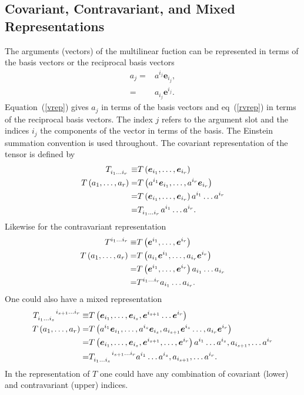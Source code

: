 \documentclass[12pt]{report}
\newcommand{\bm}[1]{\boldsymbol{#1}}
\newcommand{\lp}{\left (}
\newcommand{\rp}{\right )}
\newcommand{\f}[2]{{#1}\lp {#2} \rp}
\newcommand{\eb}{\bm{e}}
\begin{document}
\subsection{Covariant, Contravariant, and Mixed Representations}

The arguments (vectors) of the multilinear fuction can be represented in terms of the basis vectors or the reciprocal basis vectors
\begin{align}
	a_{j} =& a^{i_{j}}\eb_{i_{j}}, \label{vrep}\\
	      =& a_{i_{j}}\eb^{i_{j}}. \label{rvrep}
\end{align}
Equation~(\ref{vrep}) gives $a_{j}$ in terms of the basis vectors and eq~(\ref{rvrep}) in terms of the reciprocal basis vectors. The index
$j$ refers to the argument slot and the indices $i_{j}$ the components of the vector in terms of the basis.  The Einstein summation
convention is used throughout.  The covariant representation of the tensor is defined by
\begin{align}
	T\indices{_{i_{1}\dots i_{r}}} \equiv& \f{T}{\eb_{i_{1}},\dots,\eb_{i_{r}}} \\
	\f{T}{a_{1},\dots,a_{r}} =& \f{T}{a^{i_{1}}\eb_{i_{1}},\dots,a^{i_{r}}\eb_{i_{r}}} \nonumber \\
	                         =& \f{T}{\eb_{i_{1}},\dots,\eb_{i_{r}}}a^{i_{1}}\dots a^{i_{r}} \nonumber \\
	                         =& T\indices{_{i_{1}\dots i_{r}}}a^{i_{1}}\dots a^{i_{r}}.
\end{align}
Likewise for the contravariant representation
\begin{align}
	T\indices{^{i_{1}\dots i_{r}}} \equiv& \f{T}{\eb^{i_{1}},\dots,\eb^{i_{r}}} \\
	\f{T}{a_{1},\dots,a_{r}} =& \f{T}{a_{i_{1}}\eb^{i_{1}},\dots,a_{i_{r}}\eb^{i_{r}}} \nonumber \\
	                         =& \f{T}{\eb^{i_{1}},\dots,\eb^{i_{r}}}a_{i_{1}}\dots a_{i_{r}} \nonumber \\
	                         =& T\indices{^{i_{1}\dots i_{r}}}a_{i_{1}}\dots a_{i_{r}}.
\end{align}
One could also have a mixed representation
\begin{align}
	T\indices{_{i_{1}\dots i_{s}}^{i_{s+1}\dots i_{r}}} \equiv& \f{T}{\eb_{i_{1}},\dots,\eb_{i_{s}},\eb^{i_{s+1}}\dots\eb^{i_{r}}} \\
	\f{T}{a_{1},\dots,a_{r}} =& \f{T}{a^{i_{1}}\eb_{i_{1}},\dots,a^{i_{s}}\eb_{i_{s}},
	                            a_{i_{s+1}}\eb^{i_{s}}\dots,a_{i_{r}}\eb^{i_{r}}} \nonumber \\
	                         =& \f{T}{\eb_{i_{1}},\dots,\eb_{i_{s}},\eb^{i_{s+1}},\dots,\eb^{i_{r}}}
	                            a^{i_{1}}\dots a^{i_{s}},a_{i_{s+1}},\dots a^{i_{r}} \nonumber \\
	                         =& T\indices{_{i_{1}\dots i_{s}}^{i_{s+1}\dots i_{r}}}a^{i_{1}}\dots a^{i_{s}},a_{i_{s+1}},\dots a^{i_{r}}.
\end{align}
In the representation of $T$ one could have any combination of covariant (lower) and contravariant (upper) indices.
\end{document}
